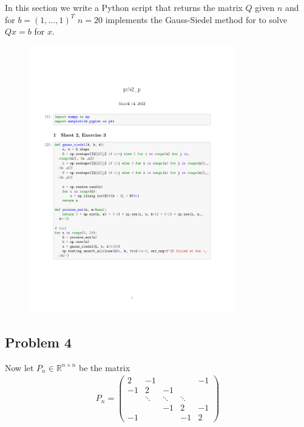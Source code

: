 \subsubsection{}
In this section we write a Python script that returns the matrix $Q$ given
$n$ and for $b = (1, \ldots ,1)^T$ $n=20$ implements the Gauss-Siedel method
for to solve $Qx = b$ for $x$.
\begin{figure}[htpb]
    \centering
    \includegraphics[width=0.8\textwidth, clip, trim=0cm 5cm 0cm 10cm]{./prog/prb2_p.pdf}
\end{figure}
\subsection{Problem 4}
Now let $P_n \in \mathbb{R}^{n\times n}$ be the matrix
\begin{align}
    P_n =
    \begin{pmatrix}
        2 & -1 &   &  & -1  \\
        -1& 2  & -1&  &   \\
          & \ddots  & \ddots & \ddots &   \\
          &   & -1 &  2 & -1\\
        -1 &   &  &  -1 & 2
    \end{pmatrix}
\end{align}
